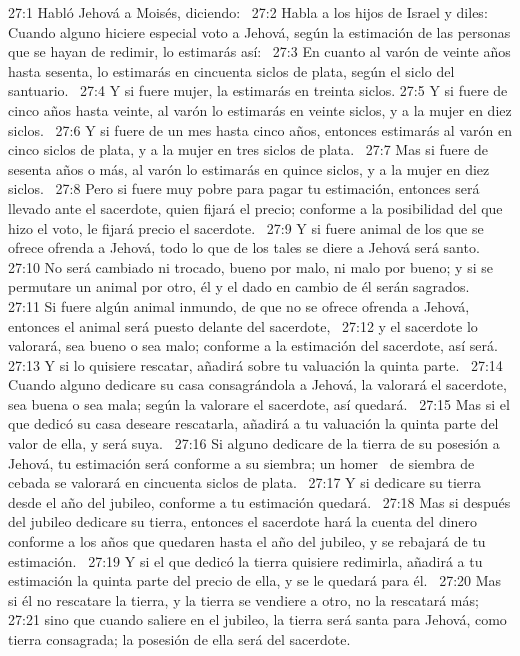 27:1 Habló Jehová a Moisés, diciendo:  
27:2 Habla a los hijos de Israel y diles: Cuando alguno hiciere especial voto a Jehová, según la estimación de las personas que se hayan de redimir, lo estimarás así:  
27:3 En cuanto al varón de veinte años hasta sesenta, lo estimarás en cincuenta siclos de plata, según el siclo del santuario.  
27:4 Y si fuere mujer, la estimarás en treinta siclos. 
27:5 Y si fuere de cinco años hasta veinte, al varón lo estimarás en veinte siclos, y a la mujer en diez siclos.  
27:6 Y si fuere de un mes hasta cinco años, entonces estimarás al varón en cinco siclos de plata, y a la mujer en tres siclos de plata.  
27:7 Mas si fuere de sesenta años o más, al varón lo estimarás en quince siclos, y a la mujer en diez siclos.  
27:8 Pero si fuere muy pobre para pagar tu estimación, entonces será llevado ante el sacerdote, quien fijará el precio; conforme a la posibilidad del que hizo el voto, le fijará precio el sacerdote.  
27:9 Y si fuere animal de los que se ofrece ofrenda a Jehová, todo lo que de los tales se diere a Jehová será santo.  
27:10 No será cambiado ni trocado, bueno por malo, ni malo por bueno; y si se permutare un animal por otro, él y el dado en cambio de él serán sagrados.  
27:11 Si fuere algún animal inmundo, de que no se ofrece ofrenda a Jehová, entonces el animal será puesto delante del sacerdote,  
27:12 y el sacerdote lo valorará, sea bueno o sea malo; conforme a la estimación del sacerdote, así será.  
27:13 Y si lo quisiere rescatar, añadirá sobre tu valuación la quinta parte.  
27:14 Cuando alguno dedicare su casa consagrándola a Jehová, la valorará el sacerdote, sea buena o sea mala; según la valorare el sacerdote, así quedará.  
27:15 Mas si el que dedicó su casa deseare rescatarla, añadirá a tu valuación la quinta parte del valor de ella, y será suya.  
27:16 Si alguno dedicare de la tierra de su posesión a Jehová, tu estimación será conforme a su siembra; un homer  de siembra de cebada se valorará en cincuenta siclos de plata.  
27:17 Y si dedicare su tierra desde el año del jubileo, conforme a tu estimación quedará.  
27:18 Mas si después del jubileo dedicare su tierra, entonces el sacerdote hará la cuenta del dinero conforme a los años que quedaren hasta el año del jubileo, y se rebajará de tu estimación.  
27:19 Y si el que dedicó la tierra quisiere redimirla, añadirá a tu estimación la quinta parte del precio de ella, y se le quedará para él.  
27:20 Mas si él no rescatare la tierra, y la tierra se vendiere a otro, no la rescatará más;  
27:21 sino que cuando saliere en el jubileo, la tierra será santa para Jehová, como tierra consagrada; la posesión de ella será del sacerdote.  
